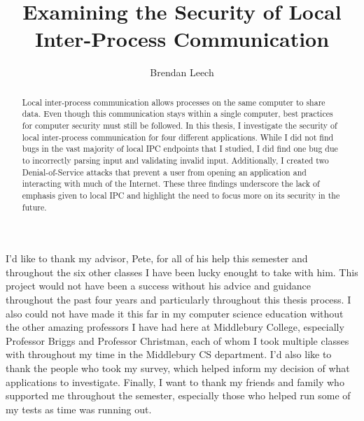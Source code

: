 \documentclass[midd]{thesis}
\title {Examining the Security of Local Inter-Process Communication}
\author {Brendan Leech}
\begin{document}
\maketitle
{}

\begin{abstract}
Local inter-process communication allows processes on the same computer to share data.  Even though this communication stays within a single computer, best practices for computer security must still be followed.  In this thesis, I investigate the security of local inter-process communication for four different applications.  While I did not find bugs in the vast majority of local IPC endpoints that I studied, I did find one bug due to incorrectly parsing input and validating invalid input.  Additionally, I created two Denial-of-Service attacks that prevent a user from opening an application and interacting with much of the Internet.  These three findings underscore the lack of emphasis given to local IPC and highlight the need to focus more on its security in the future.
\end{abstract}

\begin{acknowledgements}
I'd like to thank my advisor, Pete, for all of his help this semester and throughout the six other classes I have been lucky enought to take with him.  This project would not have been a success without his advice and guidance throughout the past four years and particularly throughout this thesis process.  I also could not have made it this far in my computer science education without the other amazing professors I have had here at Middlebury College, especially Professor Briggs and Professor Christman, each of whom I took multiple classes with throughout my time in the Middlebury CS department.  I'd also like to thank the people who took my survey, which helped inform my decision of what applications to investigate.  Finally, I want to thank my friends and family who supported me throughout the semester, especially those who helped run some of my tests as time was running out.
\end{acknowledgements}

\contentspage
\tablelistpage   %
\figurelistpage

\normalspacing \setcounter{page}{1} 









\appendix






\end{document}
